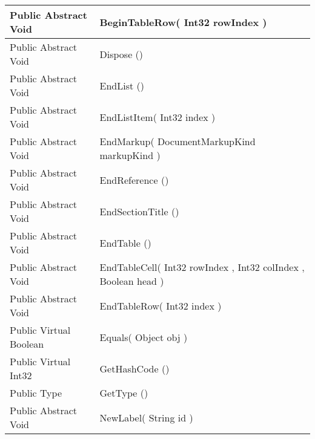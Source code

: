 \documentclass[11pt, oneside, a4paper]{book}
\begin{document}
\begin{center}
\begin{tabular}{| p{3cm} | p{12cm} | }
\hline
 Public  Abstract  Void &  BeginTableRow(\hypertarget{SoftwareEngineeringTools.{}Documentation.{}DocumentGenerator.{}BeginTableRow\_Int32}{} Int32  rowIndex  )\\
\hline
 Public  Abstract  Void &  Dispose ()\hypertarget{SoftwareEngineeringTools.{}Documentation.{}DocumentGenerator.{}Dispose}{}\\
\hline
 Public  Abstract  Void &  EndList ()\hypertarget{SoftwareEngineeringTools.{}Documentation.{}DocumentGenerator.{}EndList}{}\\
\hline
 Public  Abstract  Void &  EndListItem(\hypertarget{SoftwareEngineeringTools.{}Documentation.{}DocumentGenerator.{}EndListItem\_Int32}{} Int32  index  )\\
\hline
 Public  Abstract  Void &  EndMarkup(\hypertarget{SoftwareEngineeringTools.{}Documentation.{}DocumentGenerator.{}EndMarkup\_DocumentMarkupKind}{} DocumentMarkupKind  markupKind  )\\
\hline
 Public  Abstract  Void &  EndReference ()\hypertarget{SoftwareEngineeringTools.{}Documentation.{}DocumentGenerator.{}EndReference}{}\\
\hline
 Public  Abstract  Void &  EndSectionTitle ()\hypertarget{SoftwareEngineeringTools.{}Documentation.{}DocumentGenerator.{}EndSectionTitle}{}\\
\hline
 Public  Abstract  Void &  EndTable ()\hypertarget{SoftwareEngineeringTools.{}Documentation.{}DocumentGenerator.{}EndTable}{}\\
\hline
 Public  Abstract  Void &  EndTableCell(\hypertarget{SoftwareEngineeringTools.{}Documentation.{}DocumentGenerator.{}EndTableCell\_Int32\_Int32\_Boolean}{} Int32  rowIndex  ,  Int32  colIndex  ,  Boolean  head  )\\
\hline
 Public  Abstract  Void &  EndTableRow(\hypertarget{SoftwareEngineeringTools.{}Documentation.{}DocumentGenerator.{}EndTableRow\_Int32}{} Int32  index  )\\
\hline
 Public  Virtual  Boolean &  Equals(\hypertarget{SoftwareEngineeringTools.{}Documentation.{}DocumentGenerator.{}Equals\_Object}{} Object  obj  )\\
\hline
 Public  Virtual  Int32 &  GetHashCode ()\hypertarget{SoftwareEngineeringTools.{}Documentation.{}DocumentGenerator.{}GetHashCode}{}\\
\hline
 Public  Type &  GetType ()\hypertarget{SoftwareEngineeringTools.{}Documentation.{}DocumentGenerator.{}GetType}{}\\
\hline
 Public  Abstract  Void &  NewLabel(\hypertarget{SoftwareEngineeringTools.{}Documentation.{}DocumentGenerator.{}NewLabel\_String}{} String  id  )\\

\end{tabular}
\end{center}
\end{document}
